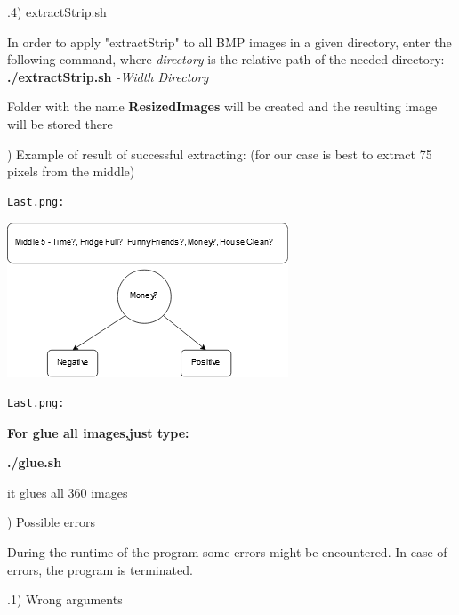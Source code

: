 \documentclass{article}
\begin{document}
.4) extractStrip.sh

In order to apply "extractStrip" to all BMP images in a given directory, enter the following command, where \textit{directory} is the relative path of the needed directory:\newline
\indent \textbf{./extractStrip.sh }\textit{-Width Directory}  

Folder with the name \textbf{ResizedImages} will be created and the resulting image will be stored there

) Example of result of successful extracting: (for our case  is best to extract 75 pixels from the middle)

\parindent=0cm

\begin{minipage}{0.5\textwidth}
\begin{verbatim}
Last.png:
\end{verbatim}
\begin{center}
\includegraphics[scale=1]{Middle.png}
\end{center}
\end{minipage}
\begin{minipage}{0.5\textwidth}
\begin{verbatim}
Last.png:
\end{verbatim}
\end{minipage}
\parindent=1.5cm
\newline
\newline
\newline



\textbf{For glue all images,just type:}

   \textbf{./glue.sh} 
   
   it glues all 360 images

) Possible errors

During the runtime of the program some errors might be encountered. In case of errors, the program is terminated.

.1) Wrong arguments
\end{document}

